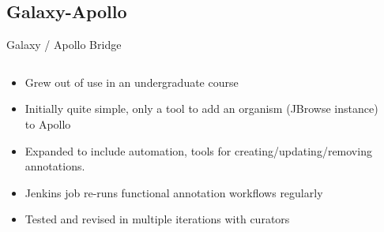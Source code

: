 \documentclass[12pt]{phage3slides} %
\begin{document}
\subsection{Galaxy-Apollo}
\begin{frame}{Galaxy / Apollo Bridge}
    \begin{columns}
        \begin{column}{0.58\textwidth}
            \begin{itemize}
                \item Grew out of use in an undergraduate course
                \item Initially quite simple, only a tool to add an organism (JBrowse instance) to Apollo
                \item Expanded to include automation, tools for creating/updating/removing annotations.
                \item Jenkins job re-runs functional annotation workflows regularly
                \item Tested and revised in multiple iterations with curators
            \end{itemize}
        \end{column}
        \begin{column}{0.38\textwidth}

\end{column}
\end{columns}
\end{frame}
\end{document}
